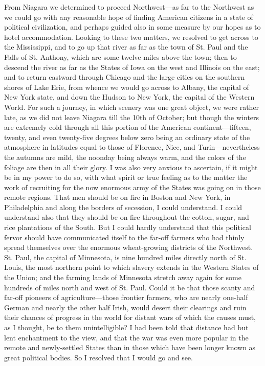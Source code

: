 From Niagara we determined to proceed Northwest---as far to the
Northwest as we could go with any reasonable hope of finding
American citizens in a state of political civilization, and perhaps
guided also in some measure by our hopes as to hotel accommodation.
Looking to these two matters, we resolved to get across to the
Mississippi, and to go up that river as far as the town of St. Paul
and the Falls of St. Anthony, which are some twelve miles above the
town; then to descend the river as far as the States of Iowa on the
west and Illinois on the east; and to return eastward through
Chicago and the large cities on the southern shores of Lake Erie,
from whence we would go across to Albany, the capital of New York
state, and down the Hudson to New York, the capital of the Western
World.  For such a journey, in which scenery was one great object,
we were rather late, as we did not leave Niagara till the 10th of
October; but though the winters are extremely cold through all this
portion of the American continent---fifteen, twenty, and even
twenty-five degrees below zero being an ordinary state of the
atmosphere in latitudes equal to those of Florence, Nice, and
Turin---nevertheless the autumns are mild, the noonday being always
warm, and the colors of the foliage are then in all their glory.  I
was also very anxious to ascertain, if it might be in my power to
do so, with what spirit or true feeling as to the matter the work
of recruiting for the now enormous army of the States was going on
in those remote regions.  That men should be on fire in Boston and
New York, in Philadelphia and along the borders of secession, I
could understand.  I could understand also that they should be on
fire throughout the cotton, sugar, and rice plantations of the
South.  But I could hardly understand that this political fervor
should have communicated itself to the far-off farmers who had
thinly spread themselves over the enormous wheat-growing districts
of the Northwest.  St. Paul, the capital of Minnesota, is nine
hundred miles directly north of St. Louis, the most northern point
to which slavery extends in the Western States of the Union; and
the farming lands of Minnesota stretch away again for some hundreds
of miles north and west of St. Paul.  Could it be that those scanty
and far-off pioneers of agriculture---those frontier farmers, who
are nearly one-half German and nearly the other half Irish, would
desert their clearings and ruin their chances of progress in the
world for distant wars of which the causes must, as I thought, be
to them unintelligible?  I had been told that distance had but lent
enchantment to the view, and that the war was even more popular in
the remote and newly-settled States than in those which have been
longer known as great political bodies.  So I resolved that I would
go and see.


